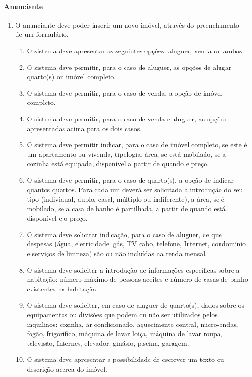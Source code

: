 \paragraph{Anunciante}
\begin{enumerate}
    \item O anunciante deve poder inserir um novo imóvel, através do preenchimento de um formulário.
    \begin{enumerate}
        \item O sistema deve apresentar as seguintes opções: aluguer, venda ou ambos.
        \item O sistema deve permitir, para o caso de aluguer, as opções de alugar quarto(s) ou imóvel completo.
        \item O sistema deve permitir, para o caso de venda, a opção de imóvel completo.
        \item O sistema deve permitir, para o caso de venda e aluguer, as opções apresentadas acima para os dois casos.
        \item O sistema deve permitir indicar, para o caso de imóvel completo, se este é um apartamento ou vivenda, tipologia, área, se está mobilado, se a cozinha está equipada, disponível a partir de quando e preço.
        \item O sistema deve permitir, para o caso de quarto(s), a opção de indicar quantos quartos. Para cada um deverá ser solicitada a introdução do seu tipo (individual, duplo, casal, múltiplo ou indiferente), a área, se é mobilado, se a casa de banho é partilhada, a partir de quando está disponível e o preço.
        \item O sistema deve solicitar indicação, para o caso de aluguer, de que despesas (água, eletricidade, gás, TV cabo, telefone, Internet, condomínio e serviços de limpeza) são ou não incluídas na renda mensal.
        \item O sistema deve solicitar a introdução de informações específicas sobre a habitação: número máximo de pessoas aceites e número de casas de banho existentes na habitação.
        \item O sistema deve solicitar, em caso de aluguer de quarto(s), dados sobre os equipamentos ou divisões que podem ou não ser utilizados pelos inquilinos: cozinha, ar condicionado, aquecimento central, micro-ondas, fogão, frigorífico, máquina de lavar loiça, máquina de lavar roupa, televisão, Internet, elevador, ginásio, piscina, garagem.
        \item O sistema deve apresentar a possibilidade de escrever um texto ou descrição acerca do imóvel.

\end{enumerate}
\end{enumerate}
